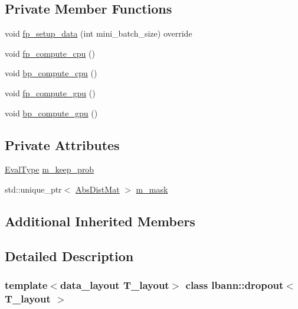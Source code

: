 \subsection*{Private Member Functions}
\begin{DoxyCompactItemize}
\item 
void \hyperlink{classlbann_1_1dropout_a478368964f515f5456324b6504a5358f}{fp\+\_\+setup\+\_\+data} (int mini\+\_\+batch\+\_\+size) override
\item 
void \hyperlink{classlbann_1_1dropout_a358c502d8e7eeb1fed8b5df468793b09}{fp\+\_\+compute\+\_\+cpu} ()
\item 
void \hyperlink{classlbann_1_1dropout_aca0160de0c3db5c29a0c4c6bddd0cf4f}{bp\+\_\+compute\+\_\+cpu} ()
\item 
void \hyperlink{classlbann_1_1dropout_ad71de4282d2164171bbcad158a7bf1e7}{fp\+\_\+compute\+\_\+gpu} ()
\item 
void \hyperlink{classlbann_1_1dropout_aeafadecbcfc81734d0c1850b4004dcc3}{bp\+\_\+compute\+\_\+gpu} ()
\end{DoxyCompactItemize}
\subsection*{Private Attributes}
\begin{DoxyCompactItemize}
\item 
\hyperlink{base_8hpp_a3266f5ac18504bbadea983c109566867}{Eval\+Type} \hyperlink{classlbann_1_1dropout_aa06cbee70f3426b589990889b8ac8872}{m\+\_\+keep\+\_\+prob}
\item 
std\+::unique\+\_\+ptr$<$ \hyperlink{base_8hpp_a9a697a504ae84010e7439ffec862b470}{Abs\+Dist\+Mat} $>$ \hyperlink{classlbann_1_1dropout_ad7d359957d41adcb64e6e3a2d4ad278d}{m\+\_\+mask}
\end{DoxyCompactItemize}
\subsection*{Additional Inherited Members}


\subsection{Detailed Description}
\subsubsection*{template$<$data\+\_\+layout T\+\_\+layout$>$\newline
class lbann\+::dropout$<$ T\+\_\+layout $>$}

